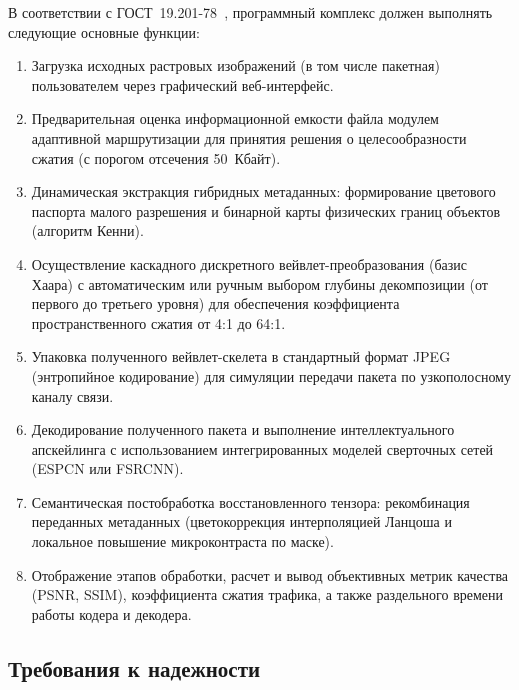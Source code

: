 В соответствии с ГОСТ~19.201-78~\cite{gost_19_201_78}, программный комплекс должен выполнять следующие основные функции:
\begin{enumerate}
    \item Загрузка исходных растровых изображений (в том числе пакетная) пользователем через графический веб-интерфейс.
    \item Предварительная оценка информационной емкости файла модулем адаптивной маршрутизации для принятия решения о целесообразности сжатия (с порогом отсечения 50~Кбайт).
    \item Динамическая экстракция гибридных метаданных: формирование цветового паспорта малого разрешения и бинарной карты физических границ объектов (алгоритм Кенни).
    \item Осуществление каскадного дискретного вейвлет-преобразования (базис Хаара) с автоматическим или ручным выбором глубины декомпозиции (от первого до третьего уровня) для обеспечения коэффициента пространственного сжатия от 4:1 до 64:1.
    \item Упаковка полученного вейвлет-скелета в стандартный формат JPEG (энтропийное кодирование) для симуляции передачи пакета по узкополосному каналу связи.
    \item Декодирование полученного пакета и выполнение интеллектуального апскейлинга с использованием интегрированных моделей сверточных сетей (ESPCN или FSRCNN).
    \item Семантическая постобработка восстановленного тензора: рекомбинация переданных метаданных (цветокоррекция интерполяцией Ланцоша и локальное повышение микроконтраста по маске).
    \item Отображение этапов обработки, расчет и вывод объективных метрик качества (PSNR, SSIM), коэффициента сжатия трафика, а также раздельного времени работы кодера и декодера.
\end{enumerate}

\subsection{Требования к надежности}

